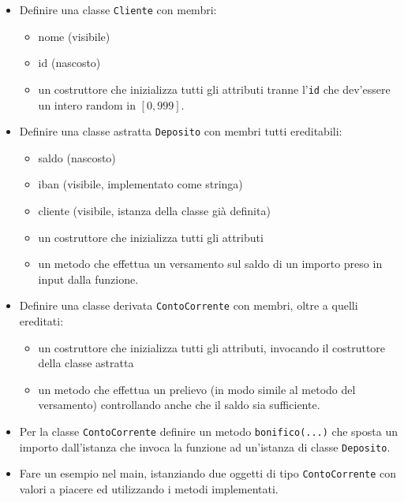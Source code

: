 \documentclass{article}
\begin{document}
\begin{itemize}

\item Definire una classe \texttt{Cliente} con membri:

	\begin{itemize}
	\item nome (visibile)
	\item id (nascosto)
	\item un costruttore che inizializza tutti gli attributi tranne l'\texttt{id} che dev'essere un intero random in $[0,999]$.
	\end{itemize}

\item Definire una classe astratta \texttt{Deposito} con membri tutti ereditabili:

	\begin{itemize}
	\item saldo (nascosto)
	\item iban (visibile, implementato come stringa)
	\item cliente (visibile, istanza della classe gi\`a definita)
	\item un costruttore che inizializza tutti gli attributi
	\item un metodo che effettua un versamento sul saldo di un importo preso in input dalla funzione.
	\end{itemize}

\item Definire una classe derivata \texttt{ContoCorrente} con membri, oltre a quelli ereditati:

	\begin{itemize}
	\item un costruttore che inizializza tutti gli attributi, invocando il costruttore della classe astratta
	\item un metodo che effettua un prelievo (in modo simile al metodo del versamento) controllando anche che il saldo sia sufficiente.
	\end{itemize}

\item Per la classe \texttt{ContoCorrente} definire un metodo \texttt{bonifico(...)} che sposta un importo dall'istanza che invoca la funzione ad un'istanza di classe \texttt{Deposito}.

\item Fare un esempio nel main, istanziando due oggetti di tipo \texttt{ContoCorrente} con valori a piacere ed utilizzando i metodi implementati.

\end{itemize}
\end{document}
